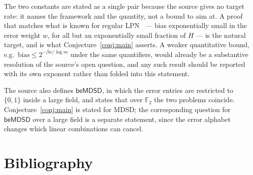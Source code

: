 \documentclass{aicr-conjecture}
\newcommand{\F}{\mathbb{F}}
\newcommand{\bias}{\mathrm{bias}}
\begin{document}
\begin{remark}
The two constants are stated as a single pair because the source gives
no target rate: it names the framework and the quantity, not a bound to
aim at. A proof that matches what is known for regular
LPN~\cite{HOSS22} --- bias exponentially small in the error weight $w$,
for all but an exponentially small fraction of $H$ --- is the natural
target, and is what Conjecture~\ref{conj:main} asserts. A weaker
quantitative bound, e.g.\ $\bias \le 2^{-\beta w / \log m}$ under the
same quantifiers, would already be a substantive resolution of the
source's open question, and any such result should be reported with its
own exponent rather than folded into this statement.
\end{remark}

\begin{remark}
The source also defines $\mathsf{beMDSD}$, in which the error entries
are restricted to $\{0,1\}$ inside a large field, and states that over
$\F_{2}$ the two problems coincide. Conjecture~\ref{conj:main} is
stated for MDSD; the corresponding question for $\mathsf{beMDSD}$ over a
large field is a separate statement, since the error alphabet changes
which linear combinations can cancel.
\end{remark}

\section{Bibliography}
\end{document}
